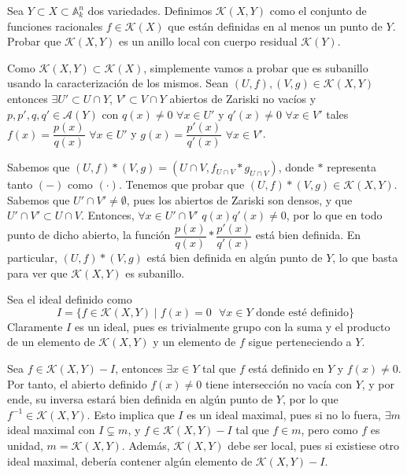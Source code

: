 \documentclass[twoside]{article}
\begin{document}
\begin{ejercicio}{6}
Sea $Y\subset X \subset \mathbb{A}_k^n$ dos variedades. Definimos $\mathcal{K}(X,Y)$ como el conjunto de funciones racionales $f \in \mathcal{K}(X)$ que están definidas en al menos un punto de $Y$. Probar que $\mathcal{K}(X,Y)$ es un anillo local con cuerpo residual $\mathcal{K}(Y)$.
\begin{solucion}
Como $\mathcal{K}(X,Y)\subset \mathcal{K}(X)$, simplemente vamos a probar que es subanillo usando la caracterización de los mismos. Sean $(U,f),(V,g)\in \mathcal{K}(X,Y)$ entonces $\exists U'\subset U\cap Y$, $V'\subset V\cap Y$ abiertos de Zariski no vacíos y $p,p',q,q'\in\mathcal{A}(Y)$ con $q(x)\neq 0$ $\forall x \in U'$ y $q'(x)\neq 0$ $\forall x \in V'$ tales $f(x)=\dfrac{p(x)}{q(x)}$ $\forall x\in U'$ y $g(x)=\dfrac{p'(x)}{q'(x)}$ $\forall x\in V'$. 

Sabemos que $(U,f)\ast (V,g) = (U\cap V, f_{U\cap V}\ast g_{U\cap V})$, donde $\ast$ representa tanto $(-)$ como $(\cdot)$. Tenemos que probar que $(U,f)\ast (V,g) \in \mathcal{K}(X,Y)$. Sabemos que $U'\cap V' \neq \emptyset$, pues los abiertos de Zariski son densos, y que $U'\cap V' \subset U\cap V$. Entonces, $\forall x \in U'\cap V'$ $q(x)q'(x)\neq 0$, por lo que en todo punto de dicho abierto, la función $\dfrac{p(x)}{q(x)}\ast\dfrac{p'(x)}{q'(x)}$ está bien definida. En particular, $(U,f)\ast (V,g)$ está bien definida en algún punto de $Y$, lo que basta para ver que $\mathcal{K}(X,Y)$ es subanillo.

Sea el ideal definido como
$$
I = \{f \in \mathcal{K}(X,Y) \mid \text{$f(x)=0$ $\forall x \in Y$ donde esté definido}\}
$$
Claramente $I$ es un ideal, pues es trivialmente grupo con la suma y el producto de un elemento de $\mathcal{K}(X,Y)$ y un elemento de $f$ sigue perteneciendo a $Y$. 

Sea $f\in \mathcal{K}(X,Y)-I$, entonces $\exists x \in Y$ tal que $f$ está definido en $Y$ y $f(x)\neq 0$. Por tanto, el abierto definido $f(x)\neq 0$ tiene intersección no vacía con $Y$, y por ende, su inversa estará bien definida en algún punto de $Y$, por lo que $f^{-1}\in \mathcal{K}(X,Y)$. Esto implica que $I$ es un ideal maximal, pues si no lo fuera, $\exists m$ ideal maximal con $I \subsetneq m$, y  $f\in \mathcal{K}(X,Y)-I$ tal que $f\in m$, pero como $f$ es unidad, $m = \mathcal{K}(X,Y)$. Además, $\mathcal{K}(X,Y)$ debe ser local, pues si existiese otro ideal maximal, debería contener algún elemento de $\mathcal{K}(X,Y)-I$.


\end{solucion}
\end{ejercicio}
\end{document}
